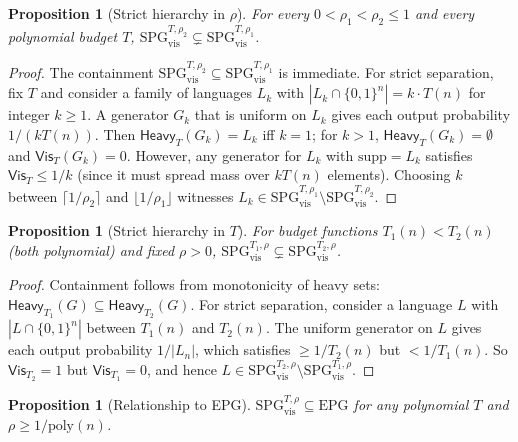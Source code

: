 \documentclass[11pt]{article}
\newcommand{\EPG}{\text{EPG}}
\newcommand{\SPGvis}[2]{\mathrm{SPG}_{\mathrm{vis}}^{#1,#2}}
\newtheorem{proposition}[definition]{Proposition}
\theoremstyle{remark}
\theoremstyle{definition}
\begin{document}
\begin{proposition}[Strict hierarchy in $\rho$]\label{prop:strict-rho-hierarchy}
For every $0 < \rho_1 < \rho_2 \le 1$ and every polynomial budget $T$,
$\SPGvis{T}{\rho_2} \subsetneq \SPGvis{T}{\rho_1}$.
\end{proposition}

\begin{proof}
The containment $\SPGvis{T}{\rho_2} \subseteq \SPGvis{T}{\rho_1}$ is
immediate.  For strict separation, fix $T$ and consider a family of languages
$L_k$ with $|L_k \cap \{0,1\}^n| = k \cdot T(n)$ for integer $k \ge 1$.
A generator $G_k$ that is uniform on $L_k$ gives each output probability
$1/(kT(n))$.  Then $\mathsf{Heavy}_T(G_k) = L_k$ iff $k = 1$; for $k > 1$,
$\mathsf{Heavy}_T(G_k) = \emptyset$ and $\mathsf{Vis}_T(G_k) = 0$.  However,
any generator for $L_k$ with $\mathrm{supp} = L_k$ satisfies
$\mathsf{Vis}_T \le 1/k$ (since it must spread mass over $kT(n)$ elements).
Choosing $k$ between $\lceil 1/\rho_2 \rceil$ and $\lfloor 1/\rho_1 \rfloor$
witnesses $L_k \in \SPGvis{T}{\rho_1} \setminus \SPGvis{T}{\rho_2}$.
\end{proof}

\begin{proposition}[Strict hierarchy in $T$]\label{prop:strict-T-hierarchy}
For budget functions $T_1(n) < T_2(n)$ (both polynomial) and fixed
$\rho > 0$, $\SPGvis{T_1}{\rho} \subsetneq \SPGvis{T_2}{\rho}$.
\end{proposition}

\begin{proof}
Containment follows from monotonicity of heavy sets:
$\mathsf{Heavy}_{T_1}(G) \subseteq \mathsf{Heavy}_{T_2}(G)$.  For strict
separation, consider a language $L$ with $|L \cap \{0,1\}^n|$ between $T_1(n)$
and $T_2(n)$.  The uniform generator on $L$ gives each output probability
$1/|L_n|$, which satisfies $\ge 1/T_2(n)$ but $< 1/T_1(n)$.  So
$\mathsf{Vis}_{T_2} = 1$ but $\mathsf{Vis}_{T_1} = 0$, and hence
$L \in \SPGvis{T_2}{\rho} \setminus \SPGvis{T_1}{\rho}$.
\end{proof}

\begin{proposition}[Relationship to EPG]\label{prop:spgvis-epg}
$\SPGvis{T}{\rho} \subseteq \EPG{}$ for any polynomial $T$ and
$\rho \ge 1/\mathrm{poly}(n)$.
\end{proposition}
\end{document}

